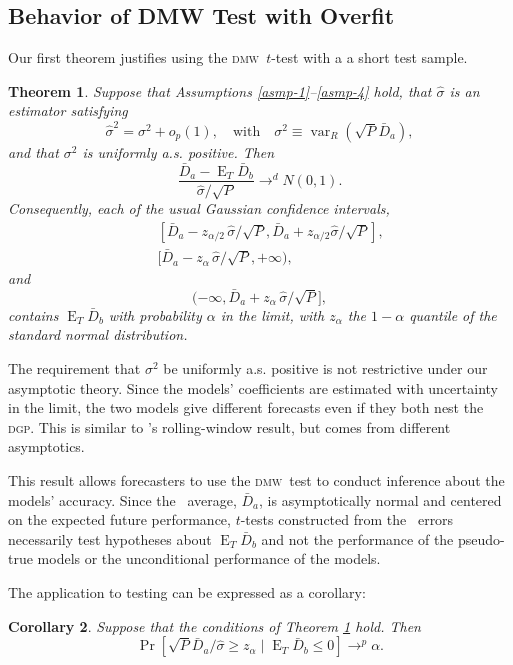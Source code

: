 \documentclass[11pt]{article}
\newtheorem{thm}{Theorem}[section]
\newtheorem{cor}[thm]{Corollary}
\DeclareMathOperator{\E}{E}
\DeclareMathOperator{\var}{var}
\newcommand{\citepos}[1]{\citeauthor{#1}'s \citeyearpar{#1}}
\newcommand{\oosA}{\bar{D}_a}
\newcommand{\oosB}{\bar{D}_b}
\newcommand{\dmw}{\textsc{dmw}}
\newcommand{\dgp}{\textsc{dgp}}
\begin{document}
\subsection{Behavior of DMW Test with Overfit}\label{sec:oostheory}
Our first theorem justifies using the \dmw\ $t$-test with a a short
test sample.

\begin{thm}\label{res-confidence-intervals}
  Suppose that Assumptions \ref{asmp-1}--\ref{asmp-4} hold, that
  $\hat\sigma$ is an estimator satisfying
  \[
    \hat\sigma^2 = \sigma^2 + o_p(1), \quad \text{with}\quad 
    \sigma^2 \equiv \var_R(\sqrt{P} \oosA),
  \]
  and that $\sigma^2$ is uniformly a.s. positive.  Then
  \[
  \frac{\oosA - \E_T\oosB}{\hat\sigma / \sqrt{P}}
  \to^d N(0,1).
  \]
  Consequently, each of the usual Gaussian confidence intervals,
  \begin{eqnarray}
  &&[\oosA - z_{\alpha/2} \, \hat\sigma /
      \sqrt{P}, \oosA + z_{\alpha/2} \hat\sigma / \sqrt{P}],\label{interval-twosided} \\
  &&[\oosA - z_{\alpha} \, \hat\sigma / \sqrt{P}, +\infty), \label{interval-greater}
  \end{eqnarray}
  and
  \begin{equation} (-\infty, \oosA + z_{\alpha}
      \, \hat\sigma / \sqrt{P}],
  \end{equation}
  contains $\E_T\oosB$ with probability $\alpha$ in the limit,
  with $z_{\alpha}$ the $1-\alpha$ quantile of the standard normal
  distribution.
\end{thm}
The requirement that $\sigma^2$ be uniformly a.s. positive is not
restrictive under our asymptotic theory.  Since the models'
coefficients are estimated with uncertainty in the limit, the two
models give different forecasts even if they both nest the \dgp.  This
is similar to \citepos{GiW:06} rolling-window result, but comes from
different asymptotics.

This result allows forecasters to use the \dmw\ test to conduct
inference about the models' accuracy.  Since the \oos\ average,
$\oosA$, is asymptotically normal and centered on the expected
future performance, $t$-tests constructed from the \oos\ errors
necessarily test hypotheses about $\E_T \oosB$ and not the
performance of the pseudo-true models or the unconditional
performance of the models.

The application to testing can be expressed as a corollary:
\begin{cor}\label{res:oostest}
Suppose that the conditions of Theorem \ref{res-confidence-intervals}
hold.  Then
\begin{equation}
  \Pr[\sqrt{P}\oosA/\hat\sigma \geq z_{\alpha} \mid \E_{T}
  \oosB \leq 0] \to^p \alpha.
\end{equation}
\end{cor}
\end{document}
